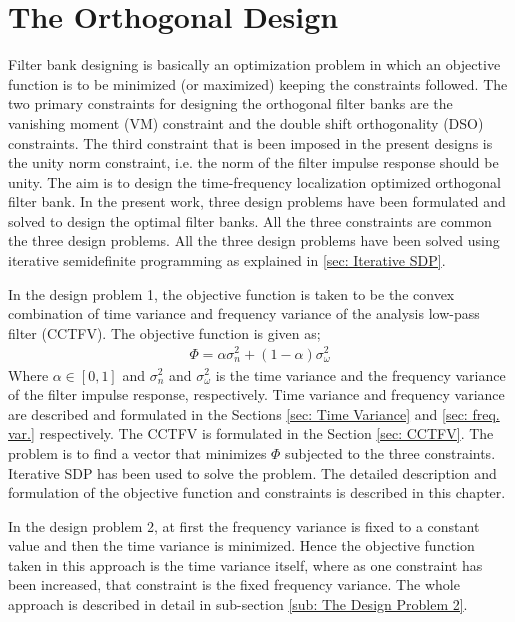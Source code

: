 \chapter{The Orthogonal Design}
Filter bank designing is basically an optimization problem in which an objective function is to be minimized (or maximized) keeping the constraints followed. The two primary constraints for designing the orthogonal filter banks are the vanishing moment (VM) constraint and the double shift orthogonality (DSO) constraints. The third constraint that is been imposed in the present designs is the unity norm constraint, i.e. the norm of the filter impulse response should be unity. The aim is to design the time-frequency localization optimized orthogonal filter bank. In the present work, three design problems have been formulated and solved to design the optimal filter banks. All the three constraints are common the three design problems. All the three design problems have been solved using iterative semidefinite programming as explained in \ref{sec: Iterative SDP}.

In the design problem 1, the objective function is taken to be the convex combination of time variance and frequency variance of the analysis low-pass filter (CCTFV). The objective function is given as;
\begin{eqnarray}
\label{eq: CCTFV}
\Phi = \alpha \sigma_n^2 + (1-\alpha)\sigma_{\omega}^{2} 
\end{eqnarray}
Where $\alpha \in [0,1]$ and $\sigma_n^2$ and $\sigma_{\omega}^{2}$ is the time variance and the frequency variance of the filter impulse response, respectively. Time variance and frequency variance are described and formulated in the Sections \ref{sec: Time Variance} and \ref{sec: freq. var.} respectively. The CCTFV is formulated in the Section \ref{sec: CCTFV}. The problem is to find a vector that minimizes $\Phi$ subjected to the three constraints. Iterative SDP has been used to solve the problem. The detailed description and formulation of the objective function and constraints is described in this chapter.

In the design problem 2, at first the frequency variance is fixed to a constant value and then the time variance is minimized. Hence the objective function taken in this approach is the time variance itself, where as one constraint has been increased, that constraint is the fixed frequency variance. The whole approach is described in detail in sub-section \ref{sub: The Design Problem 2}.

